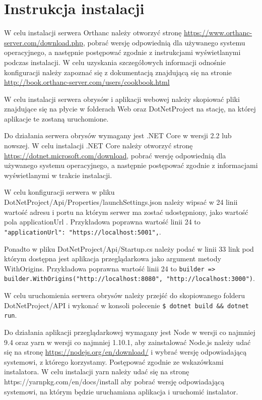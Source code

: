 \documentclass[a4paper,11pt,twoside,openright]{report}
\newcommand\blankpage{%
    \null
    \thispagestyle{empty}%
    \newpage}
\theoremstyle{definition}
\begin{document}



\afterpage{\blankpage}
\chapter*{Instrukcja instalacji}

W celu instalacji serwera Orthanc należy otworzyć stronę
\url{https://www.orthanc-server.com/download.php}, pobrać wersję odpowiednią dla
używanego systemu operacyjnego, a następnie postępować zgodnie z instrukcjami
wyświetlanymi podczas instalacji. W celu uzyskania szczegółowych informacji
odnośnie konfiguracji należy zapoznać się z dokumentacją znajdującą się na stronie
\url{http://book.orthanc-server.com/users/cookbook.html}

W celu instalacji serwera obrysów i aplikacji webowej należy skopiować pliki
znajdujące się na płycie w folderach Web oraz DotNetProject na stację,
na której aplikacje te zostaną uruchomione.

Do działania serwera obrysów wymagany jest .NET Core w wersji 2.2 lub nowszej.
W celu instalacji .NET Core należy otworzyć stronę \url{https://dotnet.microsoft.com/download},
pobrać wersję odpowiednią dla używanego systemu operacyjnego, a następnie
postępować zgodnie z informacjami wyświetlanymi w trakcie instalacji.

W celu konfiguracji serwera w pliku DotNetProject/Api/Properties/launchSettings.json
należy wipsać w 24 linii  wartość adresu i portu na którym serwer ma zostać
udostępniony, jako wartość pola applicationUrl . Przykładowa poprawna wartość
linii 24 to\texttt{ "applicationUrl": "https://localhost:5001",}.

Ponadto w pliku DotNetProject/Api/Startup.cs należy podać w linii 33 link pod
którym dostępna jest aplikacja przeglądarkowa jako argument metody WithOrigins.
Przykładowa poprawna wartość linii 24 to
\texttt{builder => builder.WithOrigins("http://localhost:8080", "http://localhost:3000")}.

W celu uruchomienia serwera obrysów należy przejść do skopiowanego folderu
DotNetProject/API i wykonać w konsoli polecenie \texttt{\$ dotnet build \&\& dotnet run}.

Do działania aplikacji przeglądarkowej wymagany jest Node w wersji co najmniej
9.4 oraz yarn w wersji co najmniej 1.10.1, aby zainstalować Node.js należy udać
się na stronę \url{https://nodejs.org/en/download/} i wybrać wersję odpowiadającą
systemowi, z którego korzystamy. Postępować zgodnie ze wskazówkami instalatora.
W celu instalacji yarn należy udać się na stronę https://yarnpkg.com/en/docs/install
aby pobrać wersję odpowiadającą systemowi, na którym będzie uruchamiana aplikacja
i uruchomić instalator.
\end{document}
